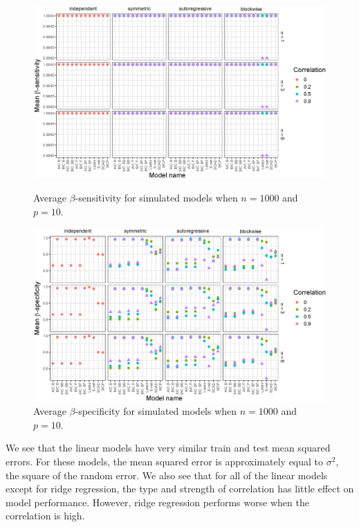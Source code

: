 \documentclass{article}
\begin{document}
\begin{figure}[h!]
	\centering
	\includegraphics[width = \textwidth]{images/facet-sensitivity/facet_sensitivity_1000_10.eps}
	\captionsetup{width = 0.8\textwidth}
	\caption{Average $\beta$-sensitivity for simulated models when $n = 1000$ and $p = 10$.}
	\label{fig:sensitivity-1000-10}
	
	\bigskip
	
	\includegraphics[width = \textwidth]{images/facet-specificity/facet_specificity_1000_10.eps}
	\captionsetup{width = 0.8\textwidth}
	\caption{Average $\beta$-specificity for simulated models when $n = 1000$ and $p = 10$.}
	\label{fig:specificity-1000-10}
\end{figure}

We see that the linear models have very similar train and test mean squared errors. For these models, the mean squared error is approximately equal to $\sigma^2$, the square of the random error. We also see that for all of the linear models except for ridge regression, the type and strength of correlation has little effect on model performance. However, ridge regression performs worse when the correlation is high.
\end{document}

